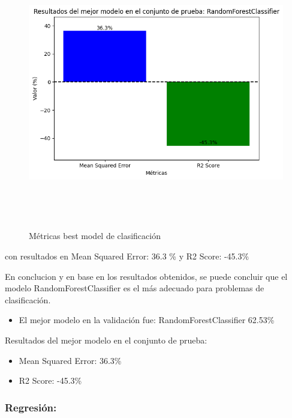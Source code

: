 \begin{figure}[H]
    \centering
    \includegraphics[width=7.06111in,height=4.68611in]{img/compara_algoritmos/metricasBestModelRandomForesClassifier.png}
    \caption{Métricas best model de clasificación}
    \label{fig:metricas_clasificacion_bestModel}
\end{figure}

con resultados en Mean Squared Error: 36.3 \%  y R2 Score: -45.3\%

En conclucion y en base en los resultados obtenidos, se puede concluir que el modelo RandomForestClassifier es el más adecuado para problemas de clasificación.

\begin{itemize}
    \item El mejor modelo en la validación fue: RandomForestClassifier 62.53\%
\end{itemize}

Resultados del mejor modelo en el conjunto de prueba:

\begin{itemize}
    \item Mean Squared Error: 36.3\%
    \item R2 Score: -45.3\%
\end{itemize}

\subsubsection*{Regresión:}

